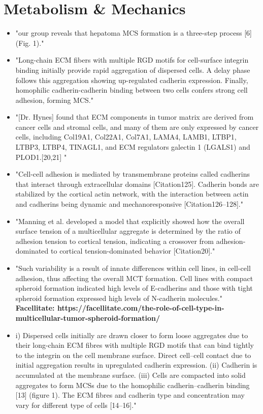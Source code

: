 \documentclass[11pt,a4paper]{article}
\begin{document}
\section{Metabolism \& Mechanics}
\begin{itemize}
\item  "our group reveals that hepatoma MCS formation is a three-step process [6] (Fig. 1)."\cite{Lin2008}

\item "Long-chain ECM fibers with multiple RGD motifs for cell-surface integrin binding initially provide rapid aggregation of dispersed cells. A delay phase follows this aggregation
showing up-regulated cadherin expression. Finally, homophilic cadherin-cadherin binding between two cells confers strong cell adhesion, forming MCS."\cite{Lin2008}

\item "[Dr. Hynes] found that ECM components in tumor matrix
are derived from cancer cells and stromal cells,
and many of them are only expressed by cancer
cells, including Col19A1, Col22A1, Col7A1, LAMA4,
LAMB1, LTBP1, LTBP3, LTBP4, TINAGL1, and ECM
regulators galectin 1 (LGALS1) and PLOD1.[20,21] "\cite{Xiong2016}
\item "Cell-cell adhesion is mediated by transmembrane proteins called cadherins that interact through extracellular domains [Citation125]. Cadherin bonds are stabilized by the cortical actin network, with the interaction between actin and cadherins being dynamic and mechanoresponsive [Citation126–128]."\cite{Boot2021}

\item "Manning et al. developed a model that explicitly showed how the overall surface tension of a multicellular aggregate is determined by the ratio of adhesion tension to cortical tension, indicating a crossover from adhesion-dominated to cortical tension-dominated behavior [Citation20]."\cite{Boot2021}

\item "Such variability is a result of innate differences within cell lines, in cell-cell adhesion, thus affecting the overall MCT formation. Cell lines with compact spheroid formation indicated high levels of E-cadherins and those with tight spheroid formation expressed high levels of N-cadherin molecules." \textbf{Facellitate: https://facellitate.com/the-role-of-cell-type-in-multicellular-tumor-spheroid-formation/}

\item i) Dispersed cells initially are drawn closer to form loose aggregates due to their long-chain ECM fibres with multiple RGD motifs that can bind tightly to the integrin on the cell membrane surface. Direct cell–cell contact due to initial aggregation results in upregulated cadherin expression. (ii) Cadherin is accumulated at the membrane surface. (iii) Cells are compacted into solid aggregates to form MCSs due to the homophilic cadherin–cadherin binding [13] (figure 1). The ECM fibres and cadherin type and concentration may vary for different type of cells [14–16]."\cite{Cui2017}


\end{itemize}
\end{document}
